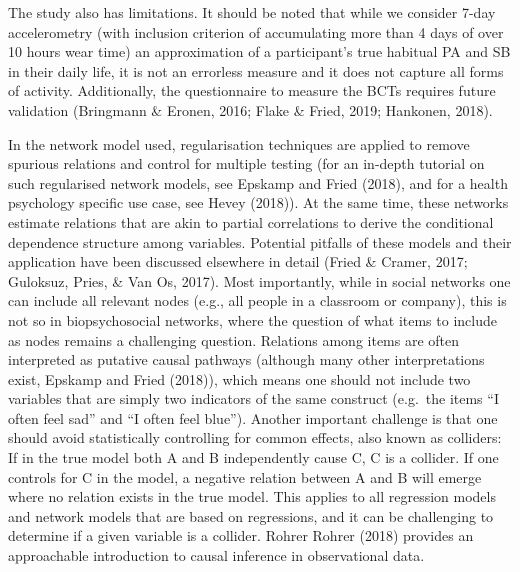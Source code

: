 \documentclass[british,man]{apa6}
\begin{document}
The study also has limitations. It should be noted that while we consider 7-day accelerometry (with inclusion criterion of accumulating more than 4 days of over 10 hours wear time) an approximation of a participant's true habitual PA and SB in their daily life, it is not an errorless measure and it does not capture all forms of activity. Additionally, the questionnaire to measure the BCTs requires future validation (Bringmann \& Eronen, 2016; Flake \& Fried, 2019; Hankonen, 2018).

In the network model used, regularisation techniques are applied to remove spurious relations and control for multiple testing (for an in-depth tutorial on such regularised network models, see Epskamp and Fried (2018), and for a health psychology specific use case, see Hevey (2018)). At the same time, these networks estimate relations that are akin to partial correlations to derive the conditional dependence structure among variables. Potential pitfalls of these models and their application have been discussed elsewhere in detail (Fried \& Cramer, 2017; Guloksuz, Pries, \& Van Os, 2017). Most importantly, while in social networks one can include all relevant nodes (e.g., all people in a classroom or company), this is not so in biopsychosocial networks, where the question of what items to include as nodes remains a challenging question. Relations among items are often interpreted as putative causal pathways (although many other interpretations exist, Epskamp and Fried (2018)), which means one should not include two variables that are simply two indicators of the same construct (e.g.~the items \enquote{I often feel sad} and \enquote{I often feel blue}). Another important challenge is that one should avoid statistically controlling for common effects, also known as colliders: If in the true model both A and B independently cause C, C is a collider. If one controls for C in the model, a negative relation between A and B will emerge where no relation exists in the true model. This applies to all regression models and network models that are based on regressions, and it can be challenging to determine if a given variable is a collider. Rohrer Rohrer (2018) provides an approachable introduction to causal inference in observational data.
\end{document}
